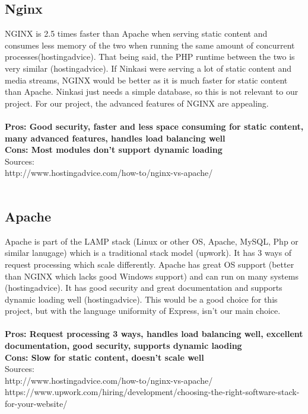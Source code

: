 \documentclass[draftclsnofoot,onecolumn,letterpaper,10pt,compsoc]{IEEEtran}
\begin{document}
	\subsection{Nginx}
		NGINX is 2.5 times faster than Apache when serving static content and consumes less memory of the two when running the same amount of concurrent processes(hostingadvice).
		That being said, the PHP runtime between the two is very similar (hostingadvice).
		If Ninkasi were serving a lot of static content and media streams, NGINX would be better as it is much faster for static content than Apache.
		Ninkasi just needs a simple database, so this is not relevant to our project.
		For our project, the advanced features of NGINX are appealing.
		\\ \\
		\textbf{Pros: Good security, faster and less space consuming for static content, many advanced features, handles load balancing well}
		\\
		\textbf{Cons: Most modules don't support dynamic loading}
		\\
		Sources: \\
		http://www.hostingadvice.com/how-to/nginx-vs-apache/\\ \\
	\subsection{Apache}
		Apache is part of the LAMP stack (Linux or other OS, Apache, MySQL, Php or similar lanugage) which is a traditional stack model (upwork).
		It has 3 ways of request processing which scale differently.
		Apache has great OS support (better than NGINX which lacks good Windows support) and can run on many systems (hostingadvice).
		It has good security and great documentation and supports dynamic loading well (hostingadvice).
		This would be a good choice for this project, but with the language uniformity of Express, isn't our main choice.
		\\ \\
		\textbf{Pros: Request processing 3 ways, handles load balancing well, excellent documentation, good security, supports dynamic laoding}
		\\
		\textbf{Cons: Slow for static content, doesn't scale well}
		\\
		Sources:\\
		http://www.hostingadvice.com/how-to/nginx-vs-apache/\\
		https://www.upwork.com/hiring/development/choosing-the-right-software-stack-for-your-website/ \\ \\
\end{document}
